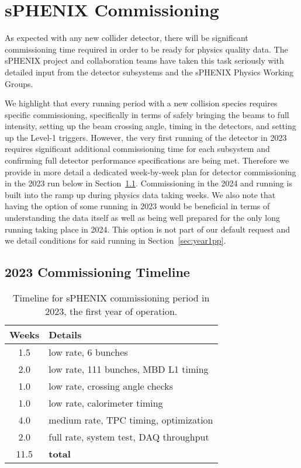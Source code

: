 \chapter{sPHENIX Commissioning}
\label{chap:commissioning}

As expected with any new collider detector, there will be significant
commissioning time required in order to be ready for physics quality
data.  The sPHENIX project and collaboration teams have taken this
task seriously with detailed input from the detector subsystems and
the sPHENIX Physics Working Groups.  

We highlight that every running period with a new collision species requires specific commissioning, specifically in terms of safely bringing the beams to full intensity, setting up the beam crossing angle, timing in the detectors, and setting up the Level-1 triggers.    However, the very first running of the detector in 2023 requires significant additional commissioning time for each subsystem and confirming full detector performance specifications are being met.   Therefore we provide in more detail a dedicated week-by-week plan for detector commissioning in the 2023 \auau run below in Section~\ref{sec:auaucomm}.    Commissioning in the 2024 \pp and \pau running is built into the ramp up during physics data taking weeks.   We also note that having the option of some \pp running in 2023 would be beneficial in terms of understanding the \auau data itself as well as being well prepared for the only long \pp running taking place in 2024.   This option is not part of our default request and we detail conditions for said running in Section~\ref{sec:year1pp}.

\section{2023 \auau Commissioning Timeline}
\label{sec:auaucomm}

\begin{table}[]
    \centering
    \begin{tabular}{|c|l|} \hline        
    Weeks &  Details \\ \midrule
        1.5 & low rate, 6 bunches \\ 
        2.0 & low rate, 111 bunches, MBD L1 timing \\ 
        1.0 & low rate, crossing angle checks \\ 
        1.0 & low rate, calorimeter timing \\ 
        4.0 & medium rate, TPC timing, optimization \\
        2.0 & full rate, system test, DAQ throughput \\ \hline
        11.5 & {\bf total} \hline
    \end{tabular}
    \caption{Timeline for sPHENIX commissioning
    period in 2023, the first year of operation.}
    \label{tab:commision}
\end{table}

